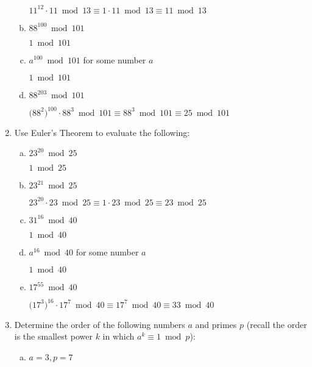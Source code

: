 \documentclass[12pt]{amsart}
\theoremstyle{plain}
\theoremstyle{definition}
\theoremstyle{remark}
\begin{document}
\begin{enumerate}[1.]
\begin{enumerate}[a.]
				\begin{framed}
				$11^{12}\cdot 11 \bmod 13 \equiv 1 \cdot 11 \bmod 13 \equiv 11 \bmod 13$
				\end{framed}
			\item $88^{100} \bmod 101$
				\begin{framed}
				$1 \bmod 101$
				\end{framed}
			\item $a^{100} \bmod 101$ for some number $a$
				\begin{framed}
				$1 \bmod 101$
				\end{framed}
			\item $88^{203} \bmod 101$
				\begin{framed}
				${(88^{2}})^{100}\cdot 88^3 \bmod 101 \equiv 88^3 \bmod 101 \equiv 25 \bmod 101$
				\end{framed}
		\end{enumerate}
		\item Use Euler's Theorem to evaluate the following:
		\begin{enumerate}[a.]
			\item $23^{20} \bmod 25$
				\begin{framed}
				$1 \bmod 25$
				\end{framed}
			\item $23^{21} \bmod 25$
				\begin{framed}
				$23^{20}\cdot 23 \bmod 25 \equiv 1 \cdot 23 \bmod 25 \equiv 23 \bmod 25$
				\end{framed}
			\item $31^{16} \bmod 40$
				\begin{framed}
				$1 \bmod 40$
				\end{framed}
			\item $a^{16} \bmod 40$ for some number $a$
				\begin{framed}
				$1 \bmod 40$
				\end{framed}
			\item $17^{55} \bmod 40$
				\begin{framed}
				${(17^{3}})^{16}\cdot 17^7 \bmod 40 \equiv 17^7 \bmod 40 \equiv 33 \bmod 40$
				\end{framed}
		\end{enumerate}
		\item Determine the order of the following numbers $a$ and primes $p$ (recall the order is the smallest power $k$ in which $a^k \equiv 1 \bmod p$):
		\begin{enumerate}[a.]
			\item $a = 3, p = 7$

\end{enumerate}
\end{enumerate}
\end{document}
